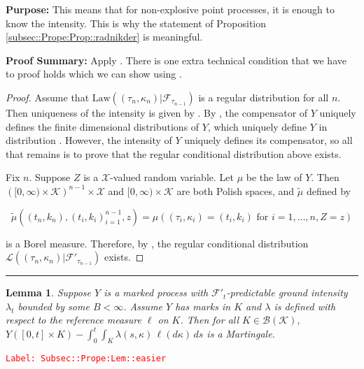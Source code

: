 \documentclass[12pt]{article}
\newcommand{\mc}{\mathcal}
\newcommand{\ms}{\mathscr}
\newcommand{\te}{\text}
\newcommand{\tr}{\textcolor{red}}
\newcommand{\labe}[1]{\tr{\texttt{Label: #1}}}
\newcommand{\purpose}{\textbf{Purpose: }}
\newcommand{\pfsum}{\textbf{Proof Summary: }}
\newcommand{\ind}{\hspace{24pt}}
\newcommand{\lin}{\rule{\linewidth}{0.4 pt}}
\newcommand{\law}{\te{Law}}						%
\newtheorem{lem}[thms]{Lemma}
\begin{document}
\purpose This means that for non-explosive point processes, it is enough to know the intensity. This is why the statement of Proposition \ref{subsec::Prope:Prop::radnikder} is meaningful.

\pfsum Apply \cite[Propositions 14.3.II(b),14.2.IV(c) and 9.2.III]{DalVer08}. There is one extra technical condition that we have to proof holds which we can show using \cite[Proposition A1.5.III]{DalVer03}.

\begin{proof}
Assume that \(\law((\tau_n,\kappa_n)|\mc{F}_{\tau_{n-1}})\) is a regular distribution for all \(n\). Then uniqueness of the intensity is given by \cite[Proposition 14.3.II (b)]{DalVer08}. By \cite[Proposition 14.2.IV (c)]{DalVer08}, the compensator of \(Y\) uniquely defines the finite dimensional distributions of \(Y\), which uniquely define \(Y\) in distribution \cite[Proposition 9.2.III]{DalVer08}. However, the intensity of \(Y\) uniquely defines its compensator, so all that remains is to prove that the regular conditional distribution above exists.

\ind Fix \(n\). Suppose \(Z\) is a \(\mc{X}\)-valued random variable. Let \(\mu\) be the law of \(Y\). Then \(\left([0,\infty)\times \mc{K}\right)^{n-1}\times\mc{X}\) and \([0,\infty)\times \mc{K}\) are both Polish spaces, and \(\tilde{\mu}\) defined by 

\[\tilde{\mu}((t_n,k_n),(t_i,k_i)_{i=1}^{n-1},z) = \mu\left((\tau_i,\kappa_i) = (t_i,k_i)\te{ for } i=1,\dots,n, Z = z\right)\]

is a Borel measure. Therefore, by \cite[Proposition A1.5.III]{DalVer03}, the regular conditional distribution \(\ms{L}((\tau_n,\kappa_n)|\mc{F}'_{\tau_{n-1}})\) exists.
\end{proof}


\lin

\begin{lem}
Suppose \(Y\) is a marked process with \(\mc{F}'_t\)-predictable ground intensity \(\lambda_t\) bounded by some \(B < \infty\). Assume \(Y\) has marks in \(K\) and \(\lambda\) is defined with respect to the reference measure \(\ell\) on \(K\). Then for all \(K \in \ms{B}(\mc{K})\), \(Y([0,t]\times K) - \int_0^t\int_K \lambda(s,\kappa)\,\ell(d\kappa)\,ds\) is a Martingale.
\label{Subsec::Prope:Lem::easier}
\end{lem}
\labe{Subsec::Prope:Lem::easier}
\end{document}

